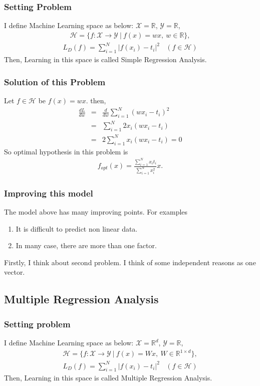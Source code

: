 \documentclass[11pt, a4paper, english, dvipdfmx]{jsarticle}
\theoremstyle{definition}
\newcommand{\R}{\mathbb{R}}
\newcommand{\X}{\mathcal{X}}
\newcommand{\Y}{\mathcal{Y}}
\newcommand{\Hil}{\mathcal{H}}
\begin{document}
\subsubsection{Setting Problem}
I define Machine Learning space as below:
$\X = \R$, $\Y = \R$,
\begin{align*}
    \Hil = \{f:\X\to\Y~|~f(x) = wx,~ w\in\R\},
\end{align*}
\begin{align*}
    L_{D}(f) = \sum_{i = 1}^{N} |f(x_{i}) - t_{i}|^{2}~~~~(f\in\Hil)
\end{align*}
Then, Learning in this space is called Simple Regression Analysis.

\subsubsection{Solution of this Problem}
Let $f\in\Hil$ be $f(x) = wx$. then,
\begin{eqnarray*}
  \frac{dL}{dw} &=& \frac{d}{dw}\sum_{i = 1}^{N}(wx_{i} - t_{i})^{2}\\
                &=& \sum_{i = 1}^{N}2x_{i}(wx_{i} - t_{i})\\
                &=& 2\sum_{i = 1}^{N}x_{i}(wx_{i} - t_{i}) = 0
\end{eqnarray*}
So optimal hypothesis in this problem is
\begin{align*}
    f_{opt}(x) = \frac{\sum_{i = 1}^{N}x_{i}t_{i}}{\sum_{i = 1}^{N} x_{i}^{2}} x.
\end{align*}

\subsubsection{Improving this model}
The model above has many improving points. For examples
\begin{enumerate}
    \item It is difficult to predict non linear data.
    \item In many case, there are more than one factor.
\end{enumerate}
Firstly, I think about second problem. I think of some independent reasons  as one vector.
\subsection{Multiple Regression Analysis}
\subsubsection{Setting problem}
I define Machine Learning space as below: $\X = \R^{d}$, $\Y = \R$,
\begin{align*}
    \Hil = \{f:\X\to\Y~|~f(x) = Wx,~ W\in\R^{1\times d}\},
\end{align*}
\begin{align*}
    L_{D}(f) = \sum_{i = 1}^{N} |f(x_{i}) - t_{i}|^{2}~~~~(f\in\Hil)
\end{align*}
Then, Learning in this space is called Multiple Regression Analysis.
\end{document}
